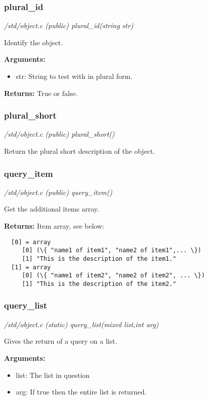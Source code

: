 \subsubsection{plural\_id}

{\em /std/object.c (public) plural\_id(string str)}

Identify the object.

{\bf Arguments:}
\begin{itemize}
\item     str: String to test with in plural form.
\end{itemize}

{\bf Returns:}    True or false.


\subsubsection{plural\_short}

{\em /std/object.c (public) plural\_short()}

Return the plural short description of the object.


\subsubsection{query\_item}

{\em /std/object.c (public) query\_item()}

Get the additional items array.

{\bf Returns:}    Item array, see below:

\begin{verbatim}
  [0] = array
     [0] (\{ "name1 of item1", "name2 of item1",... \})
     [1] "This is the description of the item1."
  [1] = array
     [0] (\{ "name1 of item2", "name2 of item2", ... \})
     [1] "This is the description of the item2."
\end{verbatim}

\subsubsection{query\_list}

{\em /std/object.c (static) query\_list(mixed list,int arg)}

Gives the return of a query on a list.

{\bf Arguments:}
\begin{itemize}
\item     list: The list in question
\item arg: If true then the entire list is returned.
\end{itemize}

